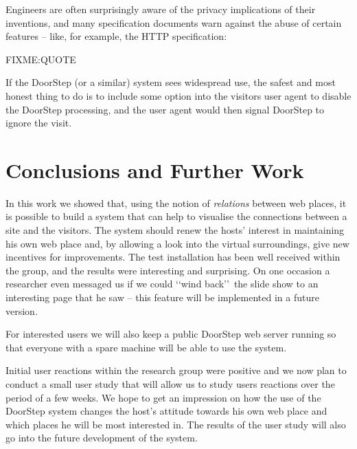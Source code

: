\documentclass[a4paper]{danarticle}
\theoremstyle{remark}
\begin{document}
    Engineers are often surprisingly aware of the privacy implications of their 
    inventions, and many specification documents warn against the abuse of 
    certain features -- like, for example, the HTTP specification\cite{http}:
    
    FIXME:QUOTE
    
    If the DoorStep (or a similar) system sees widespread use, the safest and 
    most honest thing to do is to include some option into the visitors user 
    agent to disable the DoorStep processing, and the user agent would then 
    signal DoorStep to ignore the visit.
  \section{Conclusions and Further Work} In this work we showed that, using 
    the notion of \textit{relations} between web places, it is possible to build 
    a system that can help to visualise the connections between a site and the 
    visitors. The system should renew the hosts' interest in maintaining his own 
    web place and, by allowing a look into the virtual surroundings, give new 
    incentives for improvements. The test installation has been well received 
    within the group, and the results were interesting and surprising. On one 
    occasion a researcher even messaged us if we could \lq\lq wind back\rq\rq\ 
    the slide show to an interesting page that he saw -- this feature will be 
    implemented in a future version.
    
    For interested users we will also keep a public DoorStep web server running
    so that everyone with a spare machine will be able to use the system.
    
    Initial user reactions within the research group were positive and we now
    plan to conduct a small user study that will allow us to study users
    reactions over the period of a few weeks. We hope to get an impression on how
    the use of the DoorStep system changes the host's attitude towards his own
    web place and which places he will be most interested in. The results of the
    user study will also go into the future development of the system.
    
\end{document}
